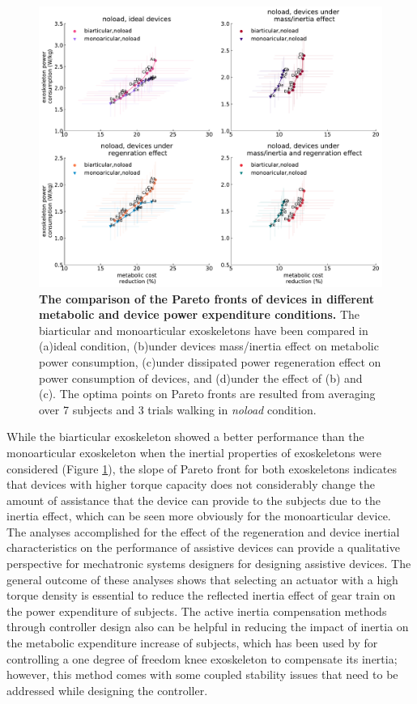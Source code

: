 \documentclass[10pt,letterpaper]{article}
\begin{document}
\begin{figure}[ht]   
	\centering
	\includegraphics[width=\linewidth]{Pareto_Mass_Regenration_Figures/PaperFigure_AddingMass_Pareto.pdf}
	\vspace{1mm}
	\caption{{\small\textbf{The comparison of the Pareto fronts of devices in different metabolic and device power expenditure conditions.} The biarticular and monoarticular exoskeletons have been compared in (a)ideal condition, (b)under devices mass/inertia effect on metabolic power consumption, (c)under dissipated power regeneration effect on power consumption of devices, and (d)under the effect of (b) and (c). The optima points on Pareto fronts are resulted from averaging over 7 subjects and 3 trials walking in {\it noload} condition.}}
	\label{Fig_Paretofronts_Mass_Regeneration_Effect}
\end{figure}
While the biarticular exoskeleton showed a better performance than the monoarticular exoskeleton when the inertial properties of exoskeletons were considered (Figure \ref{Fig_Paretofronts_Mass_Regeneration_Effect}), the slope of Pareto front for both exoskeletons indicates that devices with higher torque capacity does not considerably change the amount of assistance that the device can provide to the subjects due to the inertia effect, which can be seen more obviously for the monoarticular device.\\
The analyses accomplished for the effect of the regeneration and device inertial characteristics on the performance of assistive devices can provide a qualitative perspective for mechatronic systems designers for designing assistive devices. The general outcome of these analyses shows that selecting an actuator with a high torque density is essential to reduce the reflected inertia effect of gear train on the power expenditure of subjects. The active inertia compensation methods through controller design also can be helpful in reducing the impact of inertia on the metabolic expenditure increase of subjects, which has been used by \cite{148} for controlling  a one degree of freedom knee exoskeleton to compensate its inertia; however, this method comes with some coupled stability issues \cite{146,147,148} that need to be addressed while designing the controller.\\
\end{document}
